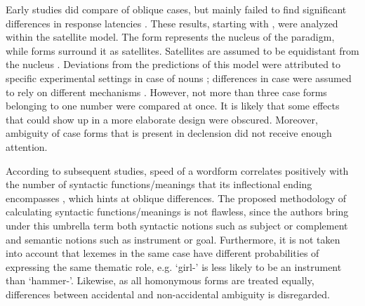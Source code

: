 \documentclass[output=paper, modfonts,newtxmath,hidelinks]{langscibook}
\begin{document}
Early  studies did compare  of oblique cases, but mainly failed to find significant differences in response latencies \citep{lukatela1978lexical, lukatelaEtAl1980, lukatela1987lexical, katz1987grammatical, kostic1987processing, feldman1987inflected}. These results, starting with \citet{lukatelaEtAl1980}, were analyzed within the satellite model. The  form represents the nucleus of the  paradigm, while  forms surround it as satellites. Satellites are assumed to be equidistant from the nucleus \citep{feldman1987inflected}. Deviations from the predictions of this model were attributed to specific experimental settings in case of nouns \citep{feldman1987inflected, todorovic1988hemispheric}; differences in  case  were assumed to rely on different mechanisms \citep{kostic1987processing}. However, not more than three case forms belonging to one number were compared at once. It is likely that some effects that could show up in a more elaborate design were obscured. Moreover, ambiguity of case forms that is present in  declension did not receive enough attention. 

According to subsequent  studies,  speed of a wordform correlates positively with the number of syntactic functions\slash meanings that its inflectional ending encompasses \citep{kostic1991informational, kostic1995information, kostic2003inflectional, filipovic2003processing,vseva2003annotated}, which hints at oblique  differences. The proposed methodology of calculating syntactic functions\slash meanings is not flawless, since the authors bring under this umbrella term both syntactic notions such as subject or complement and semantic notions such as instrument or goal. Furthermore, it is not taken into account that lexemes in the same case have different probabilities of expressing the same thematic role, e.g. `girl-\ins' is less likely to be an instrument than `hammer-\ins'. Likewise, as all homonymous forms are treated equally, differences between accidental and non-accidental ambiguity is disregarded.
\end{document}
